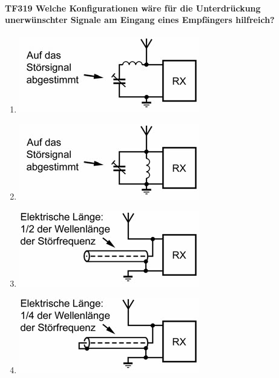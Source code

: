 \documentclass[8pt]{article}
\begin{document}
\paragraph*{TF319 Welche Konfigurationen wäre für die Unterdrückung unerwünschter Signale am Eingang eines Empfängers hilfreich?}
\begin{enumerate}[nolistsep,label=\Alph*]
\item
\begin{center}
	\begin{minipage}{\linewidth}
		\centering
		\includegraphics[scale=1.0]{pics/tf319_a.jpg}
	\end{minipage}
\end{center}
\item
\begin{center}
	\begin{minipage}{\linewidth}
		\centering
		\includegraphics[scale=1.0]{pics/tf319_b.jpg}
	\end{minipage}
\end{center}
\item
\begin{center}
	\begin{minipage}{\linewidth}
		\centering
		\includegraphics[scale=1.0]{pics/tf319_c.jpg}
	\end{minipage}
\end{center}
\item
\begin{center}
	\begin{minipage}{\linewidth}
		\centering
		\includegraphics[scale=1.0]{pics/tf319_d.jpg}
	\end{minipage}
\end{center}
\end{enumerate}
\end{document}
